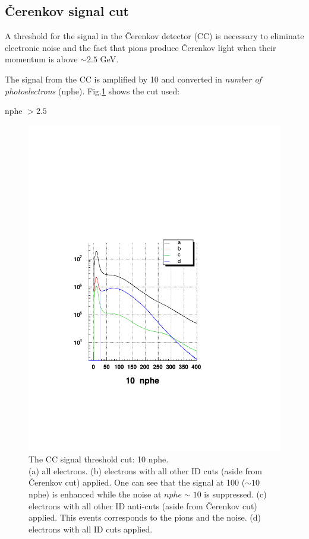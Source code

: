 \subsection{\v Cerenkov signal cut}
\label{sec:cc_cut}
A threshold for the signal in the \v Cerenkov detector (CC) is necessary to eliminate electronic noise
and the fact that pions produce \v Cerenkov light when their momentum is above $\sim 2.5$ GeV.

The signal from the CC is amplified by 10 and converted in {\it number of photoelectrons} (nphe). 
Fig.\ref{fig:cccut} shows the cut used: 
\begin{center}
nphe $> 2.5$  
\end{center}
\begin{figure}[h]
\begin{center}
  \includegraphics[width = 12cm, bb=50 140 500 540]{data_reduction/img/cc_pid}
  \caption[The CC signal threshold cut]
          { The CC signal threshold cut: 10 nphe.\\
	             (a) all electrons.
	             (b) electrons with all other ID cuts (aside from \v Cerenkov cut) applied. One can see that the 
	             signal at 100 ($\sim 10$ nphe) is enhanced while the noise at $nphe\sim 10$ is suppressed. 
		     (c) electrons with all other ID 
	             anti-cuts (aside from \v Cerenkov cut) applied. This events corresponds to the pions and the noise.
		     (d) electrons with all ID cuts applied.}
 \label{fig:cccut}
 \end{center}
\end{figure}

